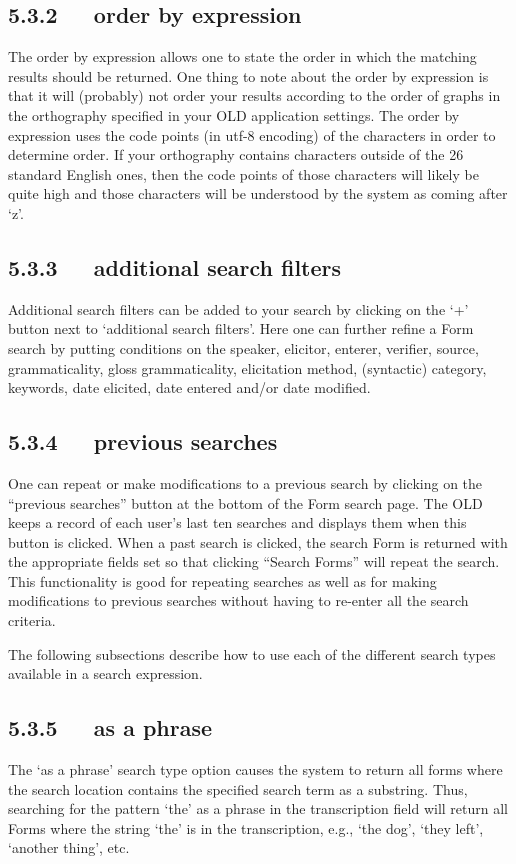 \documentclass[letterpaper,10pt,english]{sphinxmanual}
\begin{document}
\subsection{5.3.2   order by expression}
\label{user_guide:order-by-expression}
The order by expression allows one to state the order in which the matching
results should be returned.  One thing to note about the order by expression is
that it will (probably) not order your results according to the order of graphs
in the orthography specified in your OLD application settings.  The order by
expression uses the code points (in utf-8 encoding) of the characters in order
to determine order.  If your orthography contains characters outside of the 26
standard English ones, then the code points of those characters will likely be
quite high and those characters will be understood by the system as coming after
`z'.


\subsection{5.3.3   additional search filters}
\label{user_guide:additional-search-filters}
Additional search filters can be added to your search by clicking on the `+'
button next to `additional search filters'.  Here one can further refine a
Form search by putting conditions on the speaker, elicitor, enterer, verifier,
source, grammaticality, gloss grammaticality, elicitation method, (syntactic)
category, keywords, date elicited, date entered and/or date modified.


\subsection{5.3.4   previous searches}
\label{user_guide:previous-searches}
One can repeat or make modifications to a previous search by clicking
on the ``previous searches'' button at the bottom of the Form search page.  The
OLD keeps a record of each user's last ten searches and displays them when this
button is clicked.  When a past search is clicked, the search Form is returned
with the appropriate fields set so that clicking ``Search Forms'' will repeat the
search.  This functionality is good for repeating searches as well as for making
modifications to previous searches without having to re-enter all the search
criteria.

The following subsections describe how to use each of the different search types
available in a search expression.


\subsection{5.3.5   as a phrase}
\label{user_guide:as-a-phrase}
The `as a phrase' search type option causes the system to return all forms where
the search location contains the specified search term as a substring.  Thus,
searching for the pattern `the' as a phrase in the transcription field will
return all Forms where the string `the' is in the transcription, e.g., `the
dog', `they left', `another thing', etc.
\end{document}
